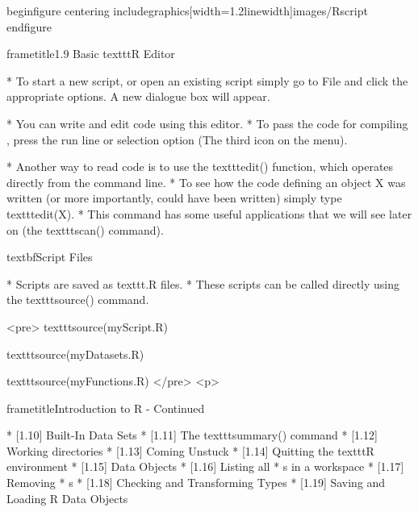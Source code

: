  		
 	
 	
 		
 			begin{figure}
 				centering
 				includegraphics[width=1.2linewidth]{images/Rscript}         
 			end{figure}
 		   
 	
 		frametitle{1.9 Basic texttt{R} Editor}
 		
 		         * To start a new script, or open an existing script simply go to File and click the appropriate
 		options. A new dialogue box will appear. 
 		
 		         * You can write and edit code using this editor.
 		         * To pass the code for compiling , press the run line or selection option (The third icon
 		on the menu).
 		
 	
 	
 		
 		
 		         * Another way to read code is to use the texttt{edit()} function, which operates directly from the
 		command line. 
 		         * To see how the code defining an object X was written (or more importantly,
 		could have been written) simply type texttt{edit(X)}. 
 		         * This command has some useful applications
 		that we will see later on (the texttt{scan()} command).
 		
 		
 	
 	
 		
 		textbf{Script Files}
 		
 			         * Scripts are saved as texttt{.R} files. 
 			         * These scripts can be called directly using the texttt{source()} command.
 		
 		
 		<pre>
 	texttt{source(myScript.R)}
 		
 		texttt{source(myDatasets.R)}
 		
 		texttt{source(myFunctions.R)}
 	</pre>
<p>
 	
 	
 	
 		frametitle{Introduction to R - Continued}
 		
 			        * [1.10] Built-In Data Sets      
 			        * [1.11] The texttt{summary()} command     
 			        * [1.12] Working directories      
 			        * [1.13] Coming Unstuck    
 			        * [1.14] Quitting the texttt{R} environment   
 			        * [1.15] Data Objects  
 			        * [1.16] Listing all         * s in a workspace     
 			        * [1.17] Removing         * s   
 			        * [1.18] Checking and Transforming Types
 			        * [1.19] Saving and Loading R Data Objects    
 		
